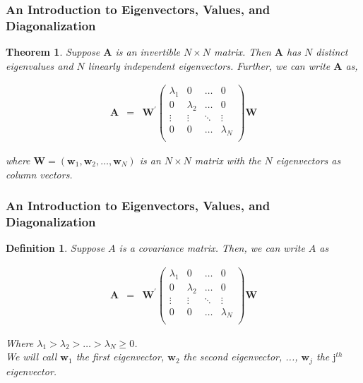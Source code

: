 \documentclass{beamer}
\newtheorem{thm}{Theorem}
\newtheorem{defn}{Definition}
\numberwithin{equation}{section}
\begin{document}
\begin{frame}
\frametitle{An Introduction to Eigenvectors, Values, and Diagonalization}


\begin{thm}
Suppose $\boldsymbol{A}$ is an \alert{invertible} $N \times N$ matrix.  Then $\boldsymbol{A}$ has $N$ distinct eigenvalues and $N$ linearly independent eigenvectors.  Further, we can write $\boldsymbol{A}$ as, 

\begin{eqnarray}
\boldsymbol{A} &= & \boldsymbol{W}^{'}\begin{pmatrix}
\lambda_{1} & 0 & \hdots & 0 \\
0 & \lambda_{2} & \hdots & 0 \\
\vdots & \vdots & \ddots & \vdots \\
0 & 0&  \hdots & \lambda_{N}\\
\end{pmatrix}
\boldsymbol{W} \nonumber 
\end{eqnarray}

where $\boldsymbol{W} = \left(\boldsymbol{w}_{1}, \boldsymbol{w}_{2}, \hdots, \boldsymbol{w}_{N} \right)$ is an $N \times N$ matrix with the $N$ eigenvectors as column vectors.  

\end{thm}

\end{frame}


\begin{frame}
\frametitle{An Introduction to Eigenvectors, Values, and Diagonalization}


\begin{defn}
Suppose $A$ is a covariance matrix.  Then, we can write $A$ as  

\begin{eqnarray}
\boldsymbol{A} &= & \boldsymbol{W}^{'}\begin{pmatrix}
\lambda_{1} & 0 & \hdots & 0 \\
0 & \lambda_{2} & \hdots & 0 \\
\vdots & \vdots & \ddots & \vdots \\
0 & 0&  \hdots & \lambda_{N}\\
\end{pmatrix}
\boldsymbol{W} \nonumber 
\end{eqnarray}

Where $\lambda_{1}>\lambda_{2} > \hdots > \lambda_{N} \geq 0$. \\
We will call $\boldsymbol{w}_{1}$ the first eigenvector, $\boldsymbol{w}_{2}$ the second eigenvector, ..., $\boldsymbol{w}_{j}$ the $\text{j}^{th}$ eigenvector.    

\end{defn}

\end{frame}
\end{document}
